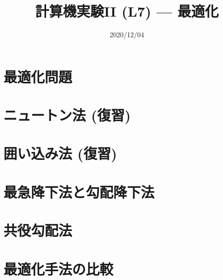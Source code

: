 \documentclass[10pt,dvipdfmx]{beamer}
\title{計算機実験II (L7) --- 最適化}
\date{2020/12/04}
\begin{document}
\begin{frame}
  \titlepage
  \tableofcontents
\end{frame}



\section{最適化問題}




\section{ニュートン法 (復習)}





\section{囲い込み法 (復習)}




\section{最急降下法と勾配降下法}






\section{共役勾配法}










\section{最適化手法の比較}







\end{document}
